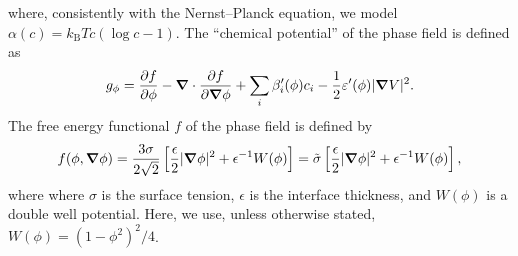 \documentclass[preprint,pre,superscriptaddress,a4paper]{revtex4-1}
\newcommand{\gv}[1]{\ensuremath{\mbox{\boldmath$ #1 $}}}
\newcommand{\pd}[2]{\frac{\partial #1}{\partial #2}}
\newcommand{\grad}[1]{\gv{\nabla} #1} %
\renewcommand{\div}[1]{\gv{\nabla} \cdot #1} %
\newcommand{\laplacian}[1]{\grad^2 #1}
\begin{document}
where, consistently with the Nernst--Planck equation, we model $\alpha(c) = k_{\mathrm{B}} T c (\log c - 1) $.
The ``chemical potential'' of the phase field is defined as
\begin{equation}
  g_\phi = \pd f \phi - \div \pd f {\grad \phi} + \sum_i \beta_i ' (\phi) c_i - \frac 1 2 \varepsilon'(\phi) | \grad V |^2 .
\end{equation}
The free energy functional $f$ of the phase field is defined by
\begin{equation}
  f(\phi, \grad \phi) = \frac{3 \sigma}{2 \sqrt{2}} \left[ \frac{\epsilon}{2} |\grad \phi|^2 + \epsilon^{-1} W(\phi) \right] = \tilde \sigma \left[ \frac{\epsilon}{2} |\grad \phi|^2 + \epsilon^{-1} W(\phi) \right],
\end{equation}
where where $\sigma$ is the surface tension, $\epsilon$ is the interface thickness, and $W(\phi)$ is a double well potential.
Here, we use, unless otherwise stated, $W(\phi) = (1-\phi^2)^2/4$.
\end{document}

